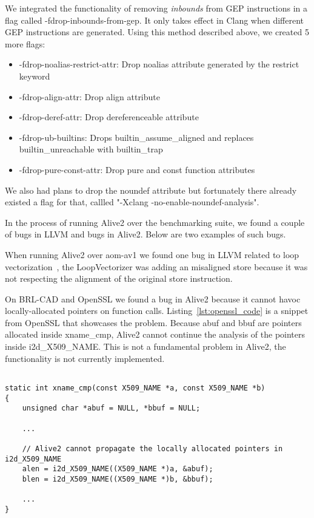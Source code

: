 We integrated the functionality of removing \textit{inbounds} from GEP
instructions in a flag called -fdrop-inbounds-from-gep. It only takes effect in
Clang when different GEP instructions are generated. Using this method described
above, we created 5 more flags:

\begin{itemize}
  \item -fdrop-noalias-restrict-attr: Drop noalias attribute generated by the
restrict keyword
  \item -fdrop-align-attr: Drop align attribute
  \item -fdrop-deref-attr: Drop dereferenceable attribute
  \item -fdrop-ub-builtins: Drops builtin_assume_aligned and replaces builtin_unreachable with builtin_trap
  \item -fdrop-pure-const-attr: Drop pure and const function attributes
\end{itemize}

We also had plans to drop the noundef attribute but fortunately there already
existed a flag for that, callled "-Xclang -no-enable-noundef-analysis".

In the process of running Alive2 over the benchmarking suite, we found a couple
of bugs in LLVM and bugs in Alive2. Below are two examples of such bugs.

When running Alive2 over aom-av1 we found one bug in LLVM related to loop
vectorization~\cite{loopvectbug}, the LoopVectorizer was adding an misaligned
store because it was not respecting the alignment of the original store
instruction.

On BRL-CAD and OpenSSL we found a bug in Alive2 because it cannot havoc
locally-allocated pointers on function calls. Listing~\ref{lst:openssl_code} is
a snippet from OpenSSL that showcases the problem. Because abuf and bbuf are
pointers allocated inside xname_cmp, Alive2 cannot continue the analysis of the
pointers inside i2d_X509_NAME. This is not a fundamental problem in Alive2, the
functionality is not currently implemented.

\begin{lstlisting}[style=Cstyle, caption={OpenSSL code that was causing Alive2 bug}, label={lst:openssl_code}]

static int xname_cmp(const X509_NAME *a, const X509_NAME *b)
{
    unsigned char *abuf = NULL, *bbuf = NULL;

    ...

    // Alive2 cannot propagate the locally allocated pointers in i2d_X509_NAME
    alen = i2d_X509_NAME((X509_NAME *)a, &abuf);
    blen = i2d_X509_NAME((X509_NAME *)b, &bbuf);

    ...
}

\end{lstlisting}
